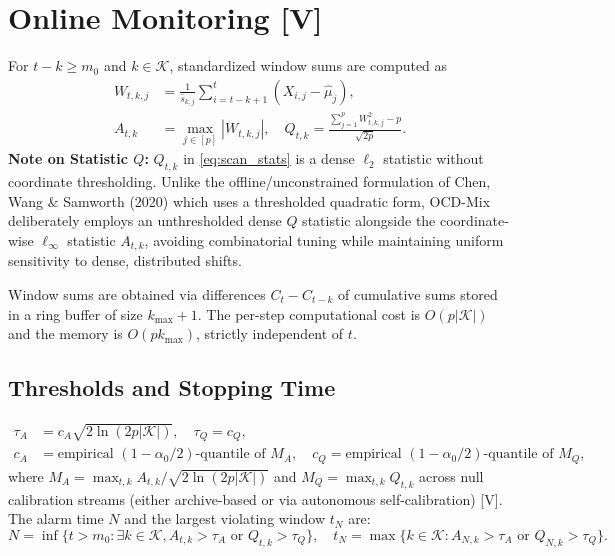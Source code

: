 \documentclass[11pt]{article}
\begin{document}
\section{Online Monitoring [V]}
For $t - k \ge m_0$ and $k \in \mathcal{K}$, standardized window sums are computed as
\begin{align}
    W_{t,k,j} &= \frac{1}{\hat{s}_{k,j}} \sum_{i=t-k+1}^t (X_{i,j} - \hat{\mu}_j), \label{eq:W_tkj} \\
    A_{t,k} &= \max_{j \in [p]} |W_{t,k,j}|, \quad Q_{t,k} = \frac{\sum_{j=1}^p W_{t,k,j}^2 - p}{\sqrt{2p}}. \label{eq:scan_stats}
\end{align}
\noindent\textbf{Note on Statistic $Q$:} $Q_{t,k}$ in \eqref{eq:scan_stats} is a dense $\ell_2$ statistic without coordinate thresholding. Unlike the offline/unconstrained formulation of Chen, Wang \& Samworth (2020) which uses a thresholded quadratic form, OCD-Mix deliberately employs an unthresholded dense $Q$ statistic alongside the coordinate-wise $\ell_\infty$ statistic $A_{t,k}$, avoiding combinatorial tuning while maintaining uniform sensitivity to dense, distributed shifts.

Window sums are obtained via differences $C_t - C_{t-k}$ of cumulative sums stored in a ring buffer of size $k_{\max} + 1$. The per-step computational cost is $O(p |\mathcal{K}|)$ and the memory is $O(p k_{\max})$, strictly independent of $t$.

\subsection{Thresholds and Stopping Time}
\begin{align}
    \tau_A &= c_A \sqrt{2 \ln(2p |\mathcal{K}|)}, \quad \tau_Q = c_Q, \label{eq:thresholds} \\
    c_A &= \text{empirical } (1 - \alpha_0/2)\text{-quantile of } M_A, \quad c_Q = \text{empirical } (1 - \alpha_0/2)\text{-quantile of } M_Q, \label{eq:calib}
\end{align}
where $M_A = \max_{t,k} A_{t,k} / \sqrt{2 \ln(2p |\mathcal{K}|)}$ and $M_Q = \max_{t,k} Q_{t,k}$ across null calibration streams (either archive-based or via autonomous self-calibration) [V].
The alarm time $N$ and the largest violating window $t_N$ are:
\begin{equation}
    N = \inf\{t > m_0 : \exists k \in \mathcal{K}, A_{t,k} > \tau_A \text{ or } Q_{t,k} > \tau_Q\}, \quad t_N = \max\{k \in \mathcal{K} : A_{N,k} > \tau_A \text{ or } Q_{N,k} > \tau_Q\}. \label{eq:alarm}
\end{equation}
\end{document}
